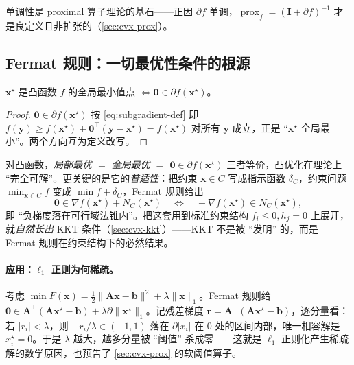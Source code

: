 单调性是 proximal 算子理论的基石——正因 $\partial f$ 单调，$\operatorname{prox}_f=(\mathbf I+\partial f)^{-1}$ 才是良定义且非扩张的（\cref{sec:cvx-prox}）。

\subsection{Fermat 规则：一切最优性条件的根源}
\label{subsec:cvx-fermat}

\begin{theorem}[Fermat 规则]\label{thm:fermat}
$\mathbf x^\star$ 是凸函数 $f$ 的全局最小值点 $\iff\mathbf 0\in\partial f(\mathbf x^\star)$。
\end{theorem}
\begin{proof}
$\mathbf 0\in\partial f(\mathbf x^\star)$ 按 \cref{eq:subgradient-def} 即 $f(\mathbf y)\ge f(\mathbf x^\star)+\mathbf 0^\top(\mathbf y-\mathbf x^\star)=f(\mathbf x^\star)$ 对所有 $\mathbf y$ 成立，正是 “$\mathbf x^\star$ 全局最小”。两个方向互为定义改写。
\end{proof}

\begin{insight}\label{ins:fermat-unify}
对凸函数，\emph{局部最优 $=$ 全局最优 $=$ $\mathbf 0\in\partial f(\mathbf x^\star)$} 三者等价，凸优化在理论上 “完全可解”。更关键的是它的\emph{普适性}：把约束 $\mathbf x\in C$ 写成指示函数 $\delta_C$，约束问题 $\min_{\mathbf x\in C}f$ 变成 $\min f+\delta_C$，Fermat 规则给出
\[
  \mathbf 0\in\nabla f(\mathbf x^\star)+N_C(\mathbf x^\star)\quad\Longleftrightarrow\quad-\nabla f(\mathbf x^\star)\in N_C(\mathbf x^\star),
\]
即 “负梯度落在可行域法锥内”。把这套用到标准约束结构 $f_i\le0,h_j=0$ 上展开，就\emph{自然长出} KKT 条件（\cref{sec:cvx-kkt}）——KKT 不是被 “发明” 的，而是 Fermat 规则在约束结构下的必然结果。
\end{insight}

\paragraph{应用：$\ell_1$ 正则为何稀疏。}
考虑 $\min F(\mathbf x)=\tfrac12\|\mathbf A\mathbf x-\mathbf b\|^2+\lambda\|\mathbf x\|_1$。Fermat 规则给 $\mathbf 0\in\mathbf A^\top(\mathbf A\mathbf x^\star-\mathbf b)+\lambda\partial\|\mathbf x^\star\|_1$。记残差梯度 $\mathbf r=\mathbf A^\top(\mathbf A\mathbf x^\star-\mathbf b)$，逐分量看：若 $|r_i|<\lambda$，则 $-r_i/\lambda\in(-1,1)$ 落在 $\partial|x_i|$ 在 $0$ 处的区间内部，唯一相容解是 $x_i^\star=0$。于是 $\lambda$ 越大，越多分量被 “阈值” 杀成零——这就是 $\ell_1$ 正则化产生稀疏解的数学原因，也预告了 \cref{sec:cvx-prox} 的软阈值算子。

